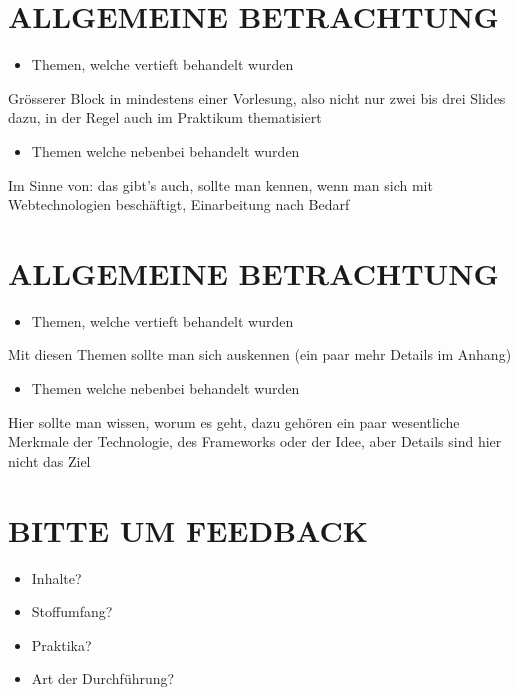 \section*{ALLGEMEINE BETRACHTUNG}
\begin{itemize}
  \item Themen, welche vertieft behandelt wurden
\end{itemize}

Grösserer Block in mindestens einer Vorlesung, also nicht nur zwei bis drei Slides dazu, in der Regel auch im Praktikum thematisiert

\begin{itemize}
  \item Themen welche nebenbei behandelt wurden
\end{itemize}

Im Sinne von: das gibt's auch, sollte man kennen, wenn man sich mit Webtechnologien beschäftigt, Einarbeitung nach Bedarf

\section*{ALLGEMEINE BETRACHTUNG}
\begin{itemize}
  \item Themen, welche vertieft behandelt wurden
\end{itemize}

Mit diesen Themen sollte man sich auskennen (ein paar mehr Details im Anhang)

\begin{itemize}
  \item Themen welche nebenbei behandelt wurden
\end{itemize}

Hier sollte man wissen, worum es geht, dazu gehören ein paar wesentliche Merkmale der Technologie, des Frameworks oder der Idee, aber Details sind hier nicht das Ziel

\section*{BITTE UM FEEDBACK}
\begin{itemize}
  \item Inhalte?
  \item Stoffumfang?
  \item Praktika?
  \item Art der Durchführung?
\end{itemize}

